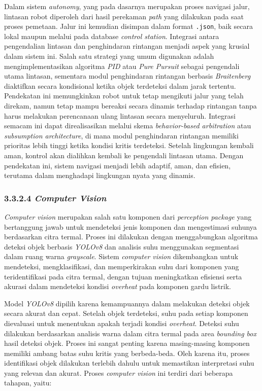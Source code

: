 Dalam sistem \emph{autonomy}, yang pada dasarnya merupakan proses navigasi jalur, lintasan robot diperoleh dari hasil perekaman \emph{path} yang dilakukan pada saat proses pemetaan. Jalur ini kemudian disimpan dalam format \texttt{.json}, baik secara lokal maupun melalui pada database \emph{control station}. Integrasi antara pengendalian lintasan dan penghindaran rintangan menjadi aspek yang krusial dalam sistem ini. Salah satu strategi yang umum digunakan adalah mengimplementasikan algoritma \emph{PID} atau \emph{Pure Pursuit} sebagai pengendali utama lintasan, sementara modul penghindaran rintangan berbasis \emph{Braitenberg} diaktifkan secara kondisional ketika objek terdeteksi dalam jarak tertentu. Pendekatan ini memungkinkan robot untuk tetap mengikuti jalur yang telah direkam, namun tetap mampu bereaksi secara dinamis terhadap rintangan tanpa harus melakukan perencanaan ulang lintasan secara menyeluruh. Integrasi semacam ini dapat direalisasikan melalui skema \emph{behavior-based arbitration} atau \emph{subsumption architecture}, di mana modul penghindaran rintangan memiliki prioritas lebih tinggi ketika kondisi kritis terdeteksi. Setelah lingkungan kembali aman, kontrol akan dialihkan kembali ke pengendali lintasan utama. Dengan pendekatan ini, sistem navigasi menjadi lebih adaptif, aman, dan efisien, terutama dalam menghadapi lingkungan nyata yang dinamis.


\subsubsection{3.3.2.4 \emph{Computer Vision}}

\emph{Computer vision} merupakan salah satu komponen dari \emph{perception package} yang bertanggung jawab untuk mendeteksi jenis komponen dan mengestimasi suhunya berdasarkan citra termal. Proses ini dilakukan dengan menggabungkan algoritma deteksi objek berbasis \emph{YOLOv8} dan analisis suhu menggunakan segmentasi dalam ruang warna \emph{grayscale}. Sistem \emph{computer vision} dikembangkan untuk mendeteksi, mengklasifikasi, dan memperkirakan suhu dari komponen yang teridentifikasi pada citra termal, dengan tujuan meningkatkan efisiensi serta akurasi dalam mendeteksi kondisi \emph{overheat} pada komponen gardu listrik.

Model \emph{YOLOv8} dipilih karena kemampuannya dalam melakukan deteksi objek secara akurat dan cepat. Setelah objek terdeteksi, suhu pada setiap komponen dievaluasi untuk menentukan apakah terjadi kondisi \emph{overheat}. Deteksi suhu dilakukan berdasarkan analisis warna dalam citra termal pada area \emph{bounding box} hasil deteksi objek. Proses ini sangat penting karena masing-masing komponen memiliki ambang batas suhu kritis yang berbeda-beda. Oleh karena itu, proses identifikasi objek dilakukan terlebih dahulu untuk memastikan interpretasi suhu yang relevan dan akurat. Proses \emph{computer vision} ini terdiri dari beberapa tahapan, yaitu:

